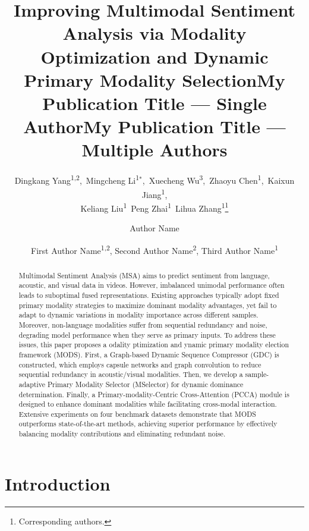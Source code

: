 \documentclass[letterpaper]{article} %
\title{Improving Multimodal Sentiment Analysis via Modality Optimization and Dynamic Primary Modality Selection}
\author{
    Dingkang Yang\textsuperscript{\rm 1,2},\, Mingcheng  Li\textsuperscript{\rm 1}$^{*}$,\, Xuecheng Wu\textsuperscript{\rm 3},\, Zhaoyu Chen\textsuperscript{\rm 1},\, Kaixun Jiang\textsuperscript{\rm 1}, \\
    Keliang Liu\textsuperscript{\rm 1}\, Peng Zhai\textsuperscript{\rm 1}\, Lihua Zhang\textsuperscript{\rm 1}\thanks{Corresponding authors.}
}
\title{My Publication Title --- Single Author}
\author {
    Author Name
}
\title{My Publication Title --- Multiple Authors}
\author {
    First Author Name\textsuperscript{\rm 1,\rm 2},
    Second Author Name\textsuperscript{\rm 2},
    Third Author Name\textsuperscript{\rm 1}
}
\begin{document}
\maketitle

\begin{abstract}
Multimodal Sentiment Analysis (MSA) aims to predict sentiment from language, acoustic, and visual data in videos. However, imbalanced unimodal performance often leads to suboptimal fused representations. Existing approaches typically adopt fixed primary modality strategies to maximize dominant modality advantages, yet fail to adapt to dynamic variations in modality importance across different samples. Moreover, non-language modalities suffer from sequential redundancy and noise, degrading model performance when they serve as primary inputs. 
To address these issues, this paper proposes a odality ptimization and ynamic primary modality election framework (MODS). First, a Graph-based Dynamic Sequence Compressor (GDC) is constructed, which employs capsule networks and graph convolution to reduce sequential redundancy in acoustic/visual modalities. Then, we develop a sample-adaptive Primary Modality Selector (MSelector) for dynamic dominance determination. Finally, a Primary-modality-Centric Cross-Attention (PCCA) module is designed to enhance dominant modalities while facilitating cross-modal interaction. Extensive experiments on four benchmark datasets demonstrate that MODS outperforms state-of-the-art methods, achieving superior performance by effectively balancing modality contributions and eliminating redundant noise.
\end{abstract}


\section{Introduction}
\end{document}
